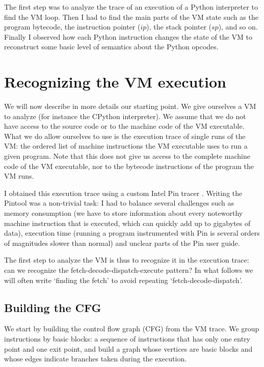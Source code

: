 \documentclass[english]{article}
\begin{document}
The first step was to analyze the trace of an execution of a Python interpreter to find the VM loop. Then I had to find the main parts of the VM state such as the program bytecode, the instruction pointer ($ip$), the stack pointer ($sp$), and so on. Finally I observed how each Python instruction changes the state of the VM to reconstruct some basic level of semantics about the Python opcodes.

\section{Recognizing the VM execution}

We will now describe in more details our starting point. We give ourselves a VM to analyze (for instance the CPython interpreter). We assume that we do not have access to the source code or to the machine code of the VM executable. What we do allow ourselves to use is the execution trace of single runs of the VM: the ordered list of machine instructions the VM executable uses to run a given program. Note that this does not give us access to the complete machine code of the VM executable, nor to the bytecode instructions of the program the VM runs. 

I obtained this execution trace using a custom Intel Pin tracer \cite{intelpin}. Writing the Pintool was a non-trivial task: I had to balance several challenges such as memory consumption (we have to store information about every noteworthy machine instruction that is executed, which can quickly add up to gigabytes of data), execution time (running a program instrumented with Pin is several orders of magnitudes slower than normal) and unclear parts of the Pin user guide.

The first step to analyze the VM is thus to recognize it in the execution trace: can we recognize the fetch-decode-dispatch-execute pattern? In what follows we will often write `finding the fetch' to avoid repeating `fetch-decode-dispatch'.

\subsection{Building the CFG}

We start by building the control flow graph (CFG) from the VM trace. We group instructions by basic blocks: a sequence of instructions that has only one entry point and one exit point, and build a graph whose vertices are basic blocks and whose edges indicate branches taken during the execution.
\end{document}
